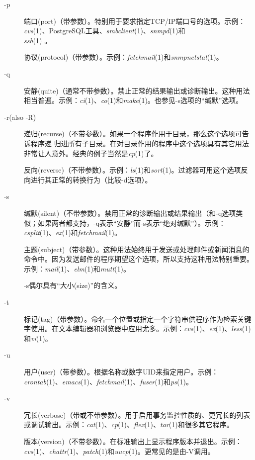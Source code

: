 \documentclass[12pt,oneside]{ctexbook}
\begin{document}
\begin{common-format}
\begin{description}
\item[-p] 端口(port)（带参数）。特别用于要求指定TCP/IP端口号的选项。示例：\textit{cvs}(1)、PostgreSQL工具、\textit{smbclient}(1)、\textit{snmpd}(1)和\\ \textit{ssh}(1) 。

协议(protocol)（带参数）。示例：\textit{fetchmail}(1)和\textit{snmpnetstat}(1)\linebreak 。

\item[-q] 安静(quite)（通常不带参数）。禁止正常的结果输出或诊断输出。这种用法相当普遍。示例：\textit{ci}(1)、\textit{co}(1)和\textit{make}(1)。也参见-s选项的“缄默”选项。

\item[-r(also -R)] 递归(recurse)（不带参数）。如果一个程序作用于目录，那么这个选项可告诉程序递
归进所有子目录。在对目录作用的程序中这个选项具有其它用法非常让人意外。经典的例子当然是\textit{cp}(1)了。

反向(reverse)（不带参数）。示例：\textit{ls}(1)和\textit{sort}(1)。过滤器可用这个选项反向进行其正常的转换行为（比较-d选项）。

\item[-s] 缄默(silent)（不带参数）。禁用正常的诊断输出或结果输出（和-q选项类似；如果两者都支持，-q表示“安静”而-s表示“绝对缄默”）。示例：\textit{csplit}(1)、\textit{ex}(1)和\textit{fetchmail}(1)。

主题(subject)（带参数）。这种用法始终用于发送或处理邮件或新闻消息的命令中。因为发送邮件的程序期望这个选项，所以支持这种用法特别重要。示例：\textit{mail}(1)、\textit{elm}(1)和\textit{mutt}(1)。

-s偶尔具有“大小(size)”的含义。

\item[-t] 标记(tag)（带参数）。命名一个位置或指定一个字符串供程序作为检索关键字使用。在文本编辑器和浏览器中应用尤多。示例：\textit{cvs}(1)、\textit{ex}(1)、\textit{less}(1)和\textit{vi}(1)。

\item[-u] 用户(user)（带参数）。根据名称或数字UID来指定用户。示例：\textit{crontab}(1)、\textit{emacs}(1)、\textit{fetchmail}(1)、\textit{fuser}(1)和\textit{ps}(1)。

\item[-v] 冗长(verbose)（带或不带参数）。用于启用事务监控性质的、更冗长的列表或调试输出。示例：\textit{cat}(1)、\textit{cp}(1)、\textit{flex}(1)、\textit{tar}(1)和很多其它程序。

版本(version)（不带参数）。在标准输出上显示程序版本并退出。示例：\textit{cvs}(1)、\textit{chattr}(1)、\textit{patch}(1)和\textit{uucp}(1)。更常见的是由-V调用。


\end{description}
\end{common-format}
\end{document}

